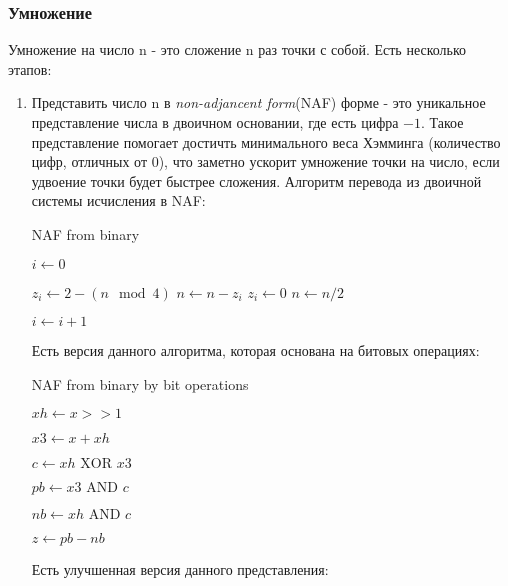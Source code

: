 \documentclass{article}
\begin{document}
    \subsubsection{Умножение}
    Умножение на число n - это сложение n раз точки с собой. Есть несколько этапов:
    \begin{enumerate}
      \item Представить число n в \textit{non-adjancent form}(NAF) форме - это уникальное представление числа в двоичном основании, где есть цифра $-1$. Такое представление помогает достичть минимального веса Хэмминга (количество цифр, отличных от 0), что заметно ускорит умножение точки на число, если удвоение точки будет быстрее сложения. Алгоритм перевода из двоичной системы исчисления в NAF: 

       \begin{algorithm}[H]
        \caption{NAF from binary}
        $i\gets 0$

         {
           {
            $z_i\gets 2 - (n\mod 4)$
            $n\gets n - z_i$
          } {
            $z_i\gets 0$
          }
          $n\gets n/2$

          $i\gets i+1$
        }
      \end{algorithm}
       Есть версия данного алгоритма, которая основана на битовых операциях:

      \begin{algorithm}[H]
        \caption{NAF from binary by bit operations}
        $xh\gets x >> 1$

        $x3\gets x + xh$

        $c\gets xh \text{ XOR } x3$

        $pb\gets x3 \text{ AND } c$

        $nb\gets xh \text{ AND } c$

        $z\gets pb - nb$
      \end{algorithm}
      Есть улучшенная версия данного представления:


\end{enumerate}
\end{document}
